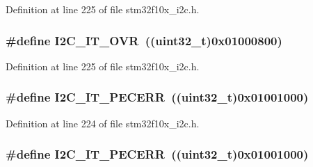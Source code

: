 Definition at line 225 of file stm32f10x\+\_\+i2c.\+h.

\subsubsection[{\texorpdfstring{I2\+C\+\_\+\+I\+T\+\_\+\+O\+VR}{I2C_IT_OVR}}]{\setlength{\rightskip}{0pt plus 5cm}\#define I2\+C\+\_\+\+I\+T\+\_\+\+O\+VR~(({\bf uint32\+\_\+t})0x01000800)}\hypertarget{group___i2_c__interrupts__definition_ga8e1e9e73d9057ccfce3493b5cf672833}{}\label{group___i2_c__interrupts__definition_ga8e1e9e73d9057ccfce3493b5cf672833}


Definition at line 225 of file stm32f10x\+\_\+i2c.\+h.

\subsubsection[{\texorpdfstring{I2\+C\+\_\+\+I\+T\+\_\+\+P\+E\+C\+E\+RR}{I2C_IT_PECERR}}]{\setlength{\rightskip}{0pt plus 5cm}\#define I2\+C\+\_\+\+I\+T\+\_\+\+P\+E\+C\+E\+RR~(({\bf uint32\+\_\+t})0x01001000)}\hypertarget{group___i2_c__interrupts__definition_ga23069e7787c4f052f34887c02bc44100}{}\label{group___i2_c__interrupts__definition_ga23069e7787c4f052f34887c02bc44100}


Definition at line 224 of file stm32f10x\+\_\+i2c.\+h.

\subsubsection[{\texorpdfstring{I2\+C\+\_\+\+I\+T\+\_\+\+P\+E\+C\+E\+RR}{I2C_IT_PECERR}}]{\setlength{\rightskip}{0pt plus 5cm}\#define I2\+C\+\_\+\+I\+T\+\_\+\+P\+E\+C\+E\+RR~(({\bf uint32\+\_\+t})0x01001000)}\hypertarget{group___i2_c__interrupts__definition_ga23069e7787c4f052f34887c02bc44100}{}\label{group___i2_c__interrupts__definition_ga23069e7787c4f052f34887c02bc44100}


